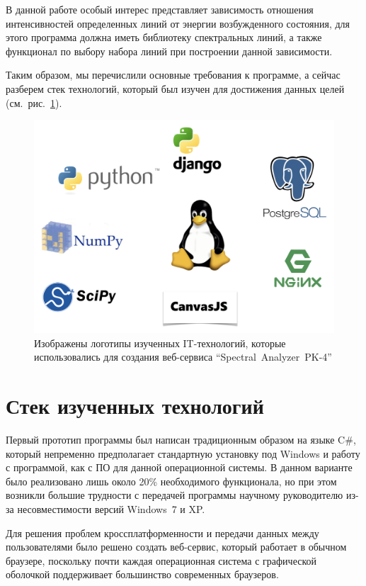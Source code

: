 В данной работе особый интерес представляет зависимость отношения интенсивностей определенных линий от энергии
возбужденного состояния, для этого программа должна иметь библиотеку спектральных линий, а также функционал
по выбору набора линий при построении данной зависимости.

Таким образом, мы перечислили основные требования к программе, а сейчас разберем стек технологий,
который был изучен для достижения данных целей (см.~рис.~\ref{fig:it_tech}).
\begin{figure}[t]
  \centering
  \includegraphics[width=12cm]{figures/it_tech}
  \caption{Изображены логотипы изученных IT-технологий, которые использовались для создания веб-сервиса “Spectral~Analyzer~PK-4”}
  \label{fig:it_tech}
\end{figure}

\section{Стек изученных технологий}
Первый прототип программы был написан традиционным образом на языке C\#, который непременно предполагает
стандартную установку под Windows и работу с программой, как с ПО для данной операционной системы.
В данном варианте было реализовано лишь около 20\% необходимого функционала, но при этом возникли большие трудности
с передачей программы научному руководителю из-за несовместимости версий Windows~7 и XP.

Для решения проблем кроссплатформенности и передачи данных между пользователями было решено создать веб-сервис,
который работает в обычном браузере, поскольку почти каждая операционная система с графической оболочкой
поддерживает большинство современных браузеров.

